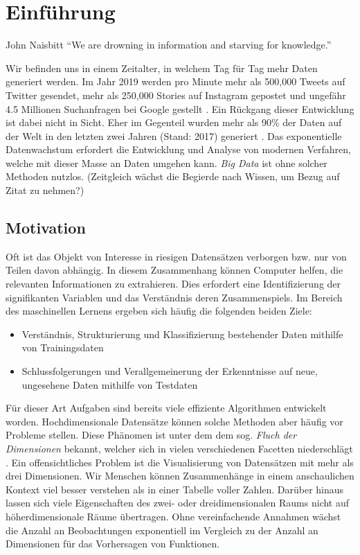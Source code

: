 \chapter{Einführung}

\label{introduction}

\begin{chapquote}{John Naisbitt}
``We are drowning in information and starving for knowledge.''
\end{chapquote}

Wir befinden uns in einem Zeitalter, in welchem Tag für Tag mehr Daten generiert werden. Im Jahr 2019 werden pro Minute mehr als 500,000 Tweets auf Twitter gesendet, mehr als 250,000 Stories auf Instagram gepostet und ungefähr 4.5 Millionen Suchanfragen bei Google gestellt \cite{domo}. Ein Rückgang dieser Entwicklung ist dabei nicht in Sicht. Eher im Gegenteil wurden mehr als 90\% der Daten auf der Welt in den letzten zwei Jahren (Stand: 2017) generiert \cite{ibm}. Das exponentielle Datenwachstum erfordert die Entwicklung und Analyse von modernen Verfahren, welche mit dieser Masse an Daten umgehen kann. \textit{Big Data} ist ohne solcher Methoden nutzlos. (Zeitgleich wächst die Begierde nach Wissen, um Bezug auf Zitat zu nehmen?)
 

\section{Motivation}

Oft ist das Objekt von Interesse in riesigen Datensätzen verborgen bzw. nur von Teilen davon abhängig. In diesem Zusammenhang können Computer helfen, die relevanten Informationen zu extrahieren. Dies erfordert eine Identifizierung der signifikanten Variablen und das Verständnis deren Zusammenspiels. Im Bereich des maschinellen Lernens ergeben sich häufig die folgenden beiden Ziele:
\begin{itemize}
\item Verständnis, Strukturierung und Klassifizierung bestehender Daten mithilfe von Trainingsdaten
\item Schlussfolgerungen und Verallgemeinerung der Erkenntnisse auf neue, ungesehene Daten mithilfe von Testdaten
\end{itemize}
Für dieser Art Aufgaben sind bereits viele effiziente Algorithmen entwickelt worden. Hochdimensionale Datensätze können solche Methoden aber häufig vor Probleme stellen. Diese Phänomen ist unter dem dem sog. \textit{Fluch der Dimensionen} bekannt, welcher sich in vielen verschiedenen Facetten niederschlägt \cite{bellman}. Ein offensichtliches Problem ist die Visualisierung von Datensätzen mit mehr als drei Dimensionen. Wir Menschen können Zusammenhänge in einem anschaulichen Kontext viel besser verstehen als in einer Tabelle voller Zahlen.
Darüber hinaus lassen sich viele Eigenschaften des zwei- oder dreidimensionalen Raums nicht auf höherdimensionale Räume übertragen.
Ohne vereinfachende Annahmen wächst die Anzahl an Beobachtungen exponentiell im Vergleich zu der Anzahl an Dimensionen für das Vorhersagen von Funktionen.



